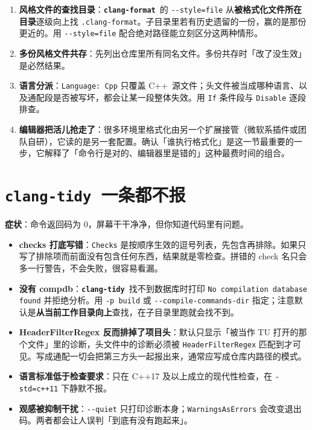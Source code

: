 \documentclass[12pt,a4paper,fontset=fandol]{ctexbook}
\newcommand{\cpp}[1]{C++#1}
\newcommand{\Opt}[1]{\texttt{-\/-#1}}
\newcommand{\Lib}[1]{\textbf{\texttt{#1}}}
\newcommand{\Lang}[1]{\textsf{#1}}
\newcommand{\CPP}{\Lang{C++}}
\newcommand{\Tidy}{\Lib{clang-tidy}}
\newcommand{\Fmt}{\Lib{clang-format}}
\begin{document}
\begin{enumerate}
  \item \textbf{风格文件的查找目录}：\Fmt\ 的 \Opt{style=file} 从\textbf{被格式化文件所在目录}逐级向上找 \texttt{.clang-format}。子目录里若有历史遗留的一份，赢的是那份更近的。用 \Opt{style=file} 配合绝对路径能立刻区分这两种情形。
  \item \textbf{多份风格文件共存}：先列出仓库里所有同名文件。多份共存时「改了没生效」是必然结果。
  \item \textbf{语言分派}：\texttt{Language: Cpp} 只覆盖 \CPP\ 源文件；头文件被当成哪种语言、以及通配段是否被写坏，都会让某一段整体失效。用 \texttt{If} 条件段与 \texttt{Disable} 逐段排查。
  \item \textbf{编辑器把活儿抢走了}：很多环境里格式化由另一个扩展接管（微软系插件或团队自研），它读的是另一套配置。确认「谁执行格式化」是这一节最重要的一步，它解释了「命令行是对的、编辑器里是错的」这种最费时间的组合。
\end{enumerate}

\section{\Tidy\ 一条都不报}\label{sec:ch17-s6}

\textbf{症状}：命令返回码为 0，屏幕干干净净，但你知道代码里有问题。

\begin{itemize}
  \item \textbf{checks 打底写错}：\texttt{Checks} 是按顺序生效的逗号列表，先包含再排除。如果只写了排除项而前面没有包含任何东西，结果就是零检查。拼错的 check 名只会多一行警告，不会失败，很容易看漏。
  \item \textbf{没有 compdb}：\Tidy\ 找不到数据库时打印 \texttt{No compilation database found} 并拒绝分析。用 \texttt{-p build} 或 \Opt{compile-commands-dir} 指定；注意默认是\textbf{从当前工作目录向上}查找，在子目录里跑就会找不到。
  \item \textbf{HeaderFilterRegex 反而排掉了项目头}：默认只显示「被当作 TU 打开的那个文件」里的诊断，头文件中的诊断必须被 \texttt{HeaderFilterRegex} 匹配到才可见。写成通配一切会把第三方头一起报出来，通常应写成仓库内路径的模式。
  \item \textbf{语言标准低于检查要求}：只在 \cpp{17} 及以上成立的现代性检查，在 \texttt{-std=c++11} 下静默不报。
  \item \textbf{观感被抑制干扰}：\Opt{quiet} 只打印诊断本身；\texttt{WarningsAsErrors} 会改变退出码。两者都会让人误判「到底有没有跑起来」。
\end{itemize}
\end{document}
